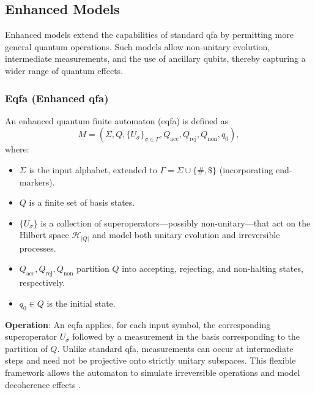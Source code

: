 \subsection{Enhanced Models}
\label{subsec:enhanced-models}

Enhanced models extend the capabilities of standard qfa by permitting more general quantum operations. Such models allow non-unitary evolution, intermediate measurements, and the use of ancillary qubits, thereby capturing a wider range of quantum effects.

\subsubsection{Eqfa (Enhanced qfa)}
\label{sssec:eqfa}
\begin{definition}[Eqfa]
An enhanced quantum finite automaton (\gls{eqfa}) is defined as 
\[
M = (\Sigma, Q, \{U_\sigma\}_{\sigma\in\Gamma}, Q_{\text{acc}}, Q_{\text{rej}}, Q_{\text{non}}, q_0),
\]
where:
\begin{itemize}
    \item \( \Sigma \) is the input alphabet, extended to \(\Gamma = \Sigma \cup \{ \#, \$\}\) (incorporating end-markers).
    \item \( Q \) is a finite set of basis states.
    \item \( \{U_\sigma\} \) is a collection of superoperators—possibly non-unitary—that act on the Hilbert space \(\mathcal{H}_{|Q|}\) and model both unitary evolution and irreversible processes.
    \item \( Q_{\text{acc}}, Q_{\text{rej}}, Q_{\text{non}} \) partition \( Q \) into accepting, rejecting, and non-halting states, respectively.
    \item \( q_0 \in Q \) is the initial state.
\end{itemize}
\end{definition}

\textbf{Operation}:  
An \gls{eqfa} applies, for each input symbol, the corresponding superoperator \( U_\sigma \) followed by a measurement in the basis corresponding to the partition of \( Q \). Unlike standard qfa, measurements can occur at intermediate steps and need not be projective onto strictly unitary subspaces. This flexible framework allows the automaton to simulate irreversible operations and model decoherence effects \cite{paschen2000quantum}.

